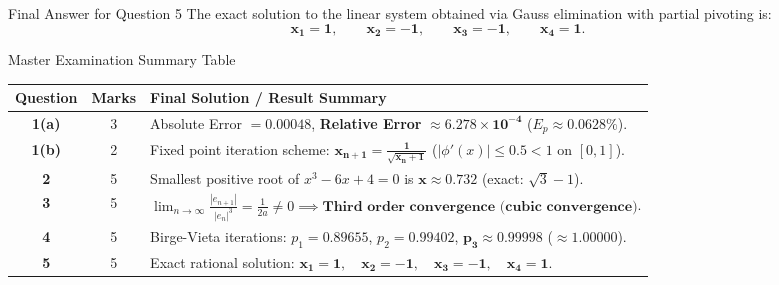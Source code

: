 \documentclass[11pt,a4paper]{article}
\begin{document}
\begin{answerbox}{Final Answer for Question 5}
The exact solution to the linear system obtained via Gauss elimination with partial pivoting is:
\[
\mathbf{x_1 = 1, \qquad x_2 = -1, \qquad x_3 = -1, \qquad x_4 = 1}.
\]
\end{answerbox}

\vspace{0.6cm}
\begin{answerbox}{Master Examination Summary Table}
\centering
\small
\begin{tabular}{ccp{11.5cm}}
\toprule
\textbf{Question} & \textbf{Marks} & \textbf{Final Solution / Result Summary} \\
\midrule
\textbf{1(a)} & 3 & Absolute Error $= 0.00048$, \textbf{Relative Error} $\approx \mathbf{6.278 \times 10^{-4}}$ ($E_p \approx 0.0628\%$). \\
\addlinespace[3pt]
\textbf{1(b)} & 2 & Fixed point iteration scheme: $\mathbf{x_{n+1} = \frac{1}{\sqrt{x_n + 1}}}$ ($|\phi'(x)| \le 0.5 < 1$ on $[0, 1]$). \\
\addlinespace[3pt]
\textbf{2} & 5 & Smallest positive root of $x^3 - 6x + 4 = 0$ is $\mathbf{x \approx 0.732}$ (exact: $\sqrt{3} - 1$). \\
\addlinespace[3pt]
\textbf{3} & 5 & $\lim_{n \to \infty} \frac{|e_{n+1}|}{|e_n|^3} = \frac{1}{2a} \neq 0 \implies \mathbf{\text{Third order convergence (cubic convergence)}}$. \\
\addlinespace[3pt]
\textbf{4} & 5 & Birge-Vieta iterations: $p_1 = 0.89655$, $p_2 = 0.99402$, $\mathbf{p_3 \approx 0.99998}$ ($\approx 1.00000$). \\
\addlinespace[3pt]
\textbf{5} & 5 & Exact rational solution: $\mathbf{x_1 = 1, \quad x_2 = -1, \quad x_3 = -1, \quad x_4 = 1}$. \\
\bottomrule
\end{tabular}
\end{answerbox}
\end{document}
